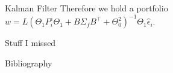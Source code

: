 \documentclass{beamer}
\begin{document}
\begin{frame}{Kalman Filter}
	Therefore we hold a portfolio $w = L(\Theta_1 P^\epsilon_i \Theta_1 + B\Sigma_f B^\top + \Theta_0^2)^{-1} \Theta_1\hat{\epsilon}_i$.
\end{frame}


\begin{frame}{Stuff I missed}

\end{frame}

\begin{frame}{Bibliography}
\end{frame}
\end{document}
